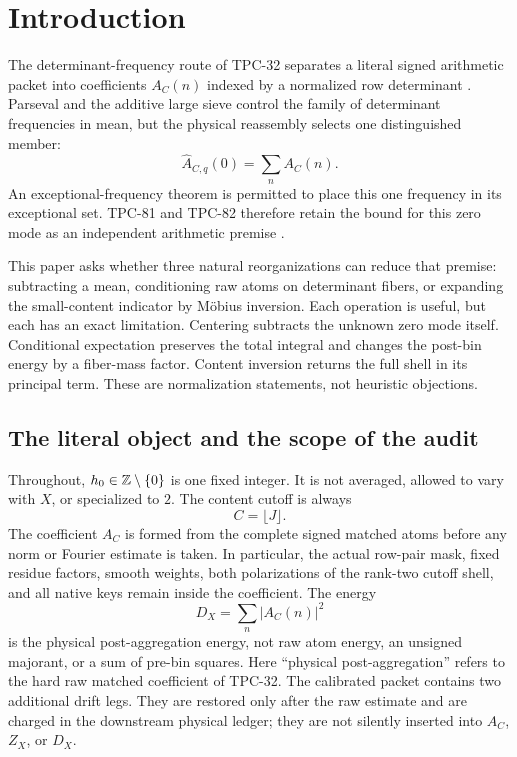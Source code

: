 \section{Introduction}
\label{sec:introduction}

The determinant-frequency route of TPC-32 separates a literal signed
arithmetic packet into coefficients \(A_C(n)\) indexed by a normalized
row determinant \citep{WangTPC32}.  Parseval and the additive large
sieve control the family of determinant frequencies in mean, but the
physical reassembly selects one distinguished member:
\[
 \widehat A_{C,q}(0)=\sum_nA_C(n).
\]
An exceptional-frequency theorem is permitted to place this one
frequency in its exceptional set.  TPC-81 and TPC-82 therefore retain
the bound for this zero mode as an independent arithmetic premise
\citep{WangTPC81,WangTPC82}.

This paper asks whether three natural reorganizations can reduce that
premise: subtracting a mean, conditioning raw atoms on determinant
fibers, or expanding the small-content indicator by M\"obius
inversion.  Each operation is useful, but each has an exact limitation.
Centering subtracts the unknown zero mode itself.  Conditional
expectation preserves the total integral and changes the post-bin
energy by a fiber-mass factor.  Content inversion returns the full
shell in its principal term.  These are normalization statements, not
heuristic objections.

\subsection{The literal object and the scope of the audit}

Throughout, \(h_0\in\mathbb Z\setminus\{0\}\) is one fixed integer.  It is not
averaged, allowed to vary with \(X\), or specialized to \(2\).  The
content cutoff is always
\begin{equation}
 C=\lfloor J\rfloor.
 \label{eq:intro-physical-cutoff}
\end{equation}
The coefficient \(A_C\) is formed from the complete signed matched
atoms before any norm or Fourier estimate is taken.  In particular,
the actual row-pair mask, fixed residue factors, smooth weights, both
polarizations of the rank-two cutoff shell, and all native keys remain
inside the coefficient.  The energy
\[
 D_X=\sum_n|A_C(n)|^2
\]
is the physical post-aggregation energy, not raw atom energy, an
unsigned majorant, or a sum of pre-bin squares.
Here ``physical post-aggregation'' refers to the hard raw matched
coefficient of TPC-32.  The calibrated packet contains two additional
drift legs.  They are restored only after the raw estimate and are
charged in the downstream physical ledger; they are not silently
inserted into \(A_C\), \(Z_X\), or \(D_X\).

